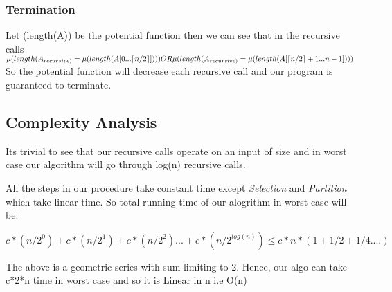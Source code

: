 \documentclass[8pt]{article}
\DeclarePairedDelimiter\ceil{\lceil}{\rceil}
\begin{document}
\subsubsection{Termination}
Let \mu(length(A)) be the potential function then we can see that in the recursive calls \\
$\mu(length(A_{recursive)} = \mu(length(A[0...\ceil{n/2}]))) OR \mu(length(A_{recursive)} = \mu(length(A[\ceil{n/2} + 1 ... n - 1])))$ \\
So the potential function will decrease each recursive call and our program is guaranteed to terminate.

\subsection{Complexity Analysis}
Its trivial to see that our recursive calls operate on an input of size   and in 
worst case our algorithm will go through log(n) recursive calls.

All the steps in our procedure take constant time except \textit{Selection} and \textit{Partition}
which take linear time. So total running time of our alogrithm in worst case will be:

$c*(n/2^0) + c*(n/2^1) + c*(n/2^2) ... + c*(n/2^{log(n)}) \le c*n*(1 + 1/2 + 1/4 ....)$

The above is a geometric series with sum limiting to 2. Hence, our algo can take c*2*n time in
worst case and so it is Linear in n i.e O(n)
\end{document}

